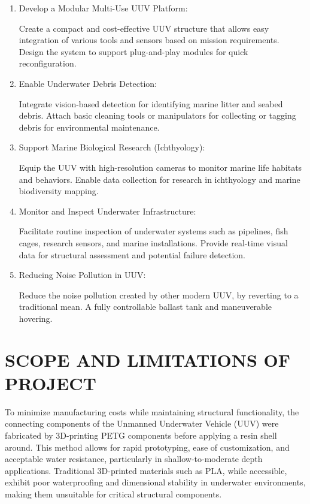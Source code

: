 \begin{enumerate}
	\item Develop a Modular Multi-Use UUV Platform:	
	
	Create a compact and cost-effective UUV structure that allows easy 
	integration of various tools and sensors based on mission requirements. 
	Design the system to support plug-and-play modules for quick 
	reconfiguration.
	\item Enable Underwater Debris Detection: 
	
	Integrate vision-based detection for identifying marine litter and 
	seabed debris. Attach basic cleaning tools or manipulators for collecting or tagging debris for environmental maintenance.
	\item Support Marine Biological Research (Ichthyology):
	
	Equip the UUV with high-resolution cameras to monitor marine 
	life habitats and behaviors. Enable data collection for research in 
	ichthyology and marine biodiversity mapping.
	\item Monitor and Inspect Underwater Infrastructure:
	
	Facilitate routine inspection of underwater systems such as pipelines, 
	fish cages, research sensors, and marine installations. Provide 
	real-time visual data for structural assessment and potential failure 
	detection. 
	\item Reducing Noise Pollution in UUV:
	
	Reduce the noise pollution created by other modern UUV, by reverting to 
	a traditional mean. A fully controllable ballast tank and maneuverable 
	hovering. 
\end{enumerate}

\section{SCOPE AND LIMITATIONS OF PROJECT}

To minimize manufacturing costs while maintaining structural 
functionality, the connecting components of the Unmanned Underwater 
Vehicle (UUV) were fabricated by 3D-printing PETG components before 
applying a resin shell around. This method allows for rapid prototyping, 
ease of customization, and acceptable water resistance, particularly in 
shallow-to-moderate depth applications. Traditional 3D-printed materials 
such as PLA, while accessible, exhibit poor waterproofing and dimensional 
stability in underwater environments, making them unsuitable for critical 
structural components.

